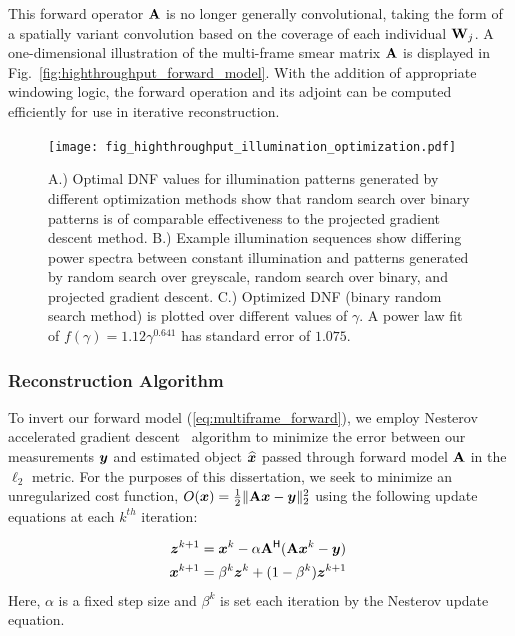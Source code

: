 This forward operator $\mathbf{A}$ is no longer generally convolutional, taking the form of a spatially variant convolution based on the coverage of each individual $\mathbf{W}_j$. A one-dimensional illustration of the multi-frame smear matrix $\mathbf{A}$ is displayed in Fig.~\ref{fig:highthroughput_forward_model}.
With the addition of appropriate windowing logic, the forward operation and its adjoint can be computed efficiently for use in iterative reconstruction.

\begin{figure}
  \centering
    \texttt{[image: fig\_highthroughput\_illumination\_optimization.pdf]}

  \caption{ \label{fig:illum_optimization} A.) Optimal DNF values for illumination patterns generated by different optimization methods show that random search over binary patterns is of comparable effectiveness to the projected gradient descent method. B.) Example illumination sequences show differing power spectra between constant illumination and patterns generated by random search over greyscale, random search over binary, and projected gradient descent. C.) Optimized DNF (binary random search method) is plotted over different values of $\gamma$. A power law fit of $f(\gamma) = 1.12 \gamma^{0.641}$ has standard error of $1.075$.}
\end{figure}

\subsubsection{Reconstruction Algorithm}\label{sec:highthroughput:recon}
To invert our forward model (\eqref{eq:multiframe_forward}), we employ Nesterov accelerated gradient descent~\cite{nesterov} algorithm to minimize the error between our measurements $\bm{y}$ and estimated object $\widehat {\bm{x}}$ passed through forward model $\mathbf{A}$ in the $\ell_2$ metric. For the purposes of this dissertation, we seek to minimize an unregularized cost function, $O(\bm{x}) = \frac{1}{2}\|\mathbf{A}\bm{x} - \bm{y}\|_2^2$ using the following update equations at each $k^{th}$ iteration:

\begin{align}\label{eq:reconstruction}
\begin{split}
    \bm z^{k+1} &= \bm{x}^k - \alpha \mathbf{A}^{\mathsf{H}} (\mathbf{A}\bm{x}^k - \bm{y}) \\
    \bm{x}^{k+1} &= \beta^k \bm z^k + (1-\beta^k) \bm z^{k+1}\:
\end{split}
\end{align}
Here, $\alpha$ is a fixed step size and $\beta^k$ is set each iteration by the Nesterov update equation.

